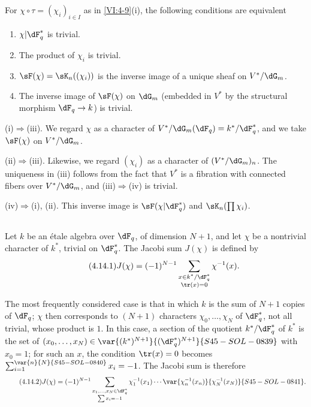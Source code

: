 \begin{lemma_}\label{VI:4-13}
For $\chi\circ \tau=(\chi_i)_{i\in I}$ as in \ref{VI:4-9}(i), the
following conditions are equivalent 
\begin{enumerate}[\indent (i)]
  \item $\chi| \dF_q^\ast$ is trivial. 
  \item The product of $\chi_i$ is trivial. 
  \item $\sF(\chi) = \sK_n((\chi_i))$ is the inverse image of a unique 
    sheaf on $V^\ast/\dG_m$. 
  \item The inverse image of $\sF(\chi)$ on $\dG_m$ (embedded in 
    $V^\ast$ by the structural morphism $\dF_q \to k$) is trivial. 
\end{enumerate}
\end{lemma_}

(i)$\Rightarrow$(iii). We regard $\chi$ as a character of 
$V^\ast/\dG_m(\dF_q)=k^\ast/\dF_q^\ast$, and we take $\sF(\chi)$ on 
$V^\ast/\dG_m$. 

(ii)$\Rightarrow$(iii). Likewise, we regard $(\chi_i)$ as a character 
of $(V^\ast/\dG_m)_n$. The uniqueness in (iii) follows from the fact that $V^\ast$ is 
a fibration with connected fibers over $V^\ast/\dG_m$, and (iii)$\Rightarrow$(iv)  
is trivial. 

(iv)$\Rightarrow$(i), (ii). This inverse image is 
$\sF(\chi|\dF_q^\ast)$ and $\sK_n(\prod \chi_i)$. 





\subsection{}\label{VI:4-14}

Let $k$ be an étale algebra over $\dF_q$, of 
dimension $N+1$, and let $\chi$ be a nontrivial character of $k^\ast$, trivial on 
$\dF_q^\ast$. The Jacobi sum $J(\chi)$ is defined by 
\begin{equation*}\tag{4.14.1}\label{VI:eq:4-14-1}
  J(\chi) = (-1)^{N-1} \sum_{\substack{x\in k^\ast/\dF_q^\ast \\ \tr(x)=0}} \chi^{-1}(x) \text{.} 
\end{equation*}

The most frequently considered case is that in which $k$ is the sum of $N+1$
copies of $\dF_q$; $\chi$ then corresponds to $(N+1)$ characters
$\chi_0,\ldots,\chi_N$ of $\dF_q^\ast$, not all trivial, whose product is $1$.
In this case, a section of the quotient $k^\ast/\dF_q^\ast$ of $k^\ast$
is the set of $(x_0,\ldots,x_N)\in\var{(k^\ast)^{N+1}}{(\dF_q^\ast)^{N+1}}{S45-SOL-0839}$ with $x_0=1$;
for such an $x$, the condition $\tr(x)=0$ becomes $\sum_{i=1}^{\var{n}{N}{S45-SOL-0840}}x_i=-1$.
The Jacobi sum is therefore
\begin{equation*}\tag{4.14.2}\label{VI:eq:4-14-2}
 J(\chi)=(-1)^{N-1}\sum_{\substack{x_1,\ldots,x_N\in\dF_q^\ast\\\sum x_i=-1}}
 \chi_1^{-1}(x_1)\cdots\var{\chi_n^{-1}(x_n)}{\chi_N^{-1}(x_N)}{S45-SOL-0841} \text{.}
\end{equation*}


